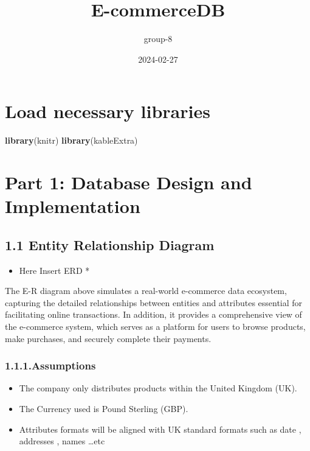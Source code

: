 \documentclass[
]{article}
\title{E-commerceDB}
\author{group-8}
\date{2024-02-27}
\newenvironment{Shaded}{\begin{snugshade}}{\end{snugshade}}
\newcommand{\FunctionTok}[1]{\textcolor[rgb]{0.13,0.29,0.53}{\textbf{#1}}}
\newcommand{\NormalTok}[1]{#1}
\providecommand{\tightlist}{%
  \setlength{\itemsep}{0pt}\setlength{\parskip}{0pt}}
\begin{document}
\maketitle

\hypertarget{load-necessary-libraries}{%
\section{Load necessary libraries}\label{load-necessary-libraries}}

\begin{Shaded}
\begin{Highlighting}[]
\FunctionTok{library}\NormalTok{(knitr)}
\FunctionTok{library}\NormalTok{(kableExtra)}
\end{Highlighting}
\end{Shaded}

\hypertarget{part-1-database-design-and-implementation}{%
\section{Part 1: Database Design and
Implementation}\label{part-1-database-design-and-implementation}}

\hypertarget{entity-relationship-diagram}{%
\subsection{1.1 Entity Relationship
Diagram}\label{entity-relationship-diagram}}

\begin{itemize}
\tightlist
\item
  Here Insert ERD *
\end{itemize}

The E-R diagram above simulates a real-world e-commerce data ecosystem,
capturing the detailed relationships between entities and attributes
essential for facilitating online transactions. In addition, it provides
a comprehensive view of the e-commerce system, which serves as a
platform for users to browse products, make purchases, and securely
complete their payments.

\hypertarget{assumptions}{%
\subsubsection{1.1.1.Assumptions}\label{assumptions}}

\begin{itemize}
\item
  The company only distributes products within the United Kingdom (UK).
\item
  The Currency used is Pound Sterling (GBP).
\item
  Attributes formats will be aligned with UK standard formats such as
  date , addresses , names \ldots etc
\end{itemize}
\end{document}
